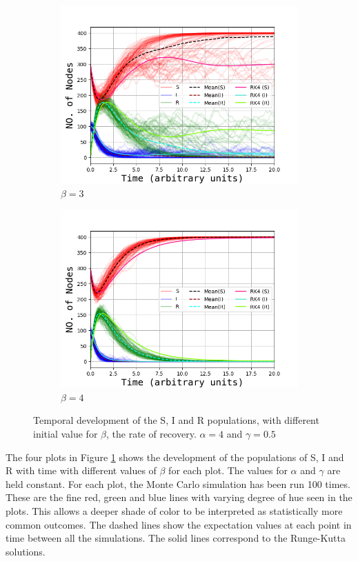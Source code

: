 \begin{figure}[H]
\begin{subfigure}{0.49\linewidth}
			\includegraphics[width=1.1\linewidth]{Figures/OppgA_4_3_05.png}
			\caption{$\beta = 3$}
		\end{subfigure}
		\begin{subfigure}{0.49\linewidth}
		    \includegraphics[width=1.1\linewidth]{Figures/OppgA_4_4_05.png}
			\caption{$\beta = 4$}
		\end{subfigure}
		\caption{Temporal development of the S, I and R populations, with different initial value for $\beta$, the rate of recovery. $\alpha = 4$ and $\gamma = 0.5$}
		\label{fig:1}
	\end{figure}
	
The four plots in Figure \ref{fig:1} shows the development of the populations of S, I and R with time with different values of $\beta$ for each plot. The values for $\alpha$ and $\gamma$ are held constant. For each plot, the Monte Carlo simulation has been run 100 times. These are the fine red, green and blue lines with varying degree of hue seen in the plots. This allows a deeper shade of color to be interpreted as statistically more common outcomes. The dashed lines show the expectation values at each point in time between all the simulations. The solid lines correspond to the Runge-Kutta solutions.

